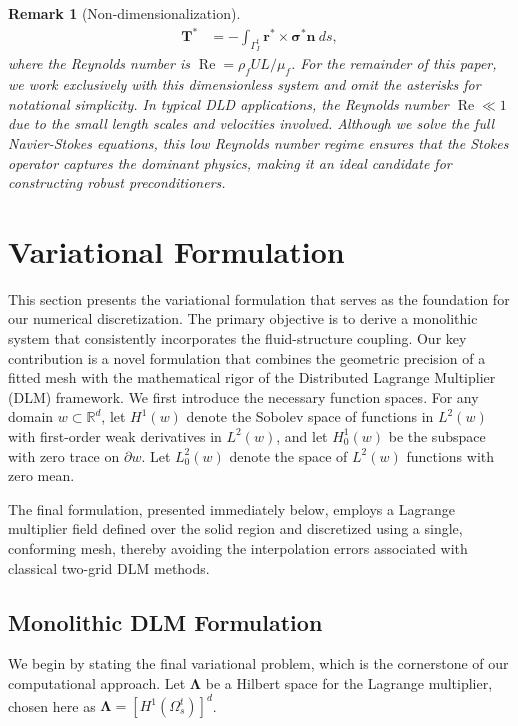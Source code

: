 \documentclass{article}
\newcommand{\Reynolds}{{\operatorname{Re}}}
\newtheorem{remark}[theorem]{Remark}
\begin{document}
\begin{remark}[Non-dimensionalization]
\begin{subequations}
\begin{align}
        \mathbf{T}^* &= -\int_{\Gamma_I^t} \mathbf{r}^*\times\boldsymbol{\sigma}^*\mathbf{n}\ ds,\label{subeq:torque}
    \end{align}
\end{subequations}
where the Reynolds number is $\Reynolds = \rho_f U L / \mu_f$. For the remainder of this paper, we work exclusively with this dimensionless system and omit the asterisks for notational simplicity. In typical DLD applications, the Reynolds number $\Reynolds \ll 1$ due to the small length scales and velocities involved. Although we solve the full Navier-Stokes equations, this low Reynolds number regime ensures that the Stokes operator captures the dominant physics, making it an ideal candidate for constructing robust preconditioners.
\end{remark}


\section{Variational Formulation}
\label{sec:variational_formulation}

This section presents the variational formulation that serves as the foundation for our numerical discretization. The primary objective is to derive a {monolithic} system that consistently incorporates the fluid-structure coupling. Our key contribution is a novel formulation that combines the geometric precision of a fitted mesh with the mathematical rigor of the Distributed Lagrange Multiplier (DLM) framework. We first introduce the necessary function spaces. For any domain $w \subset \mathbb{R}^d$, let $H^1(w)$ denote the Sobolev space of functions in $L^2(w)$ with first-order weak derivatives in $L^2(w)$, and let $H^1_0(w)$ be the subspace with zero trace on $\partial w$. Let $L^2_0(w)$ denote the space of $L^2(w)$ functions with zero mean.

The final formulation, presented immediately below, employs a Lagrange multiplier field defined over the solid region and discretized using a single, conforming mesh, thereby avoiding the interpolation errors associated with classical two-grid DLM methods.

\subsection{Monolithic DLM Formulation}

We begin by stating the final variational problem, which is the cornerstone of our computational approach. Let $\boldsymbol{\Lambda}$ be a Hilbert space for the Lagrange multiplier, chosen here as $\boldsymbol{\Lambda} = [H^1(\Omega_s^t)]^d$.
\end{document}
